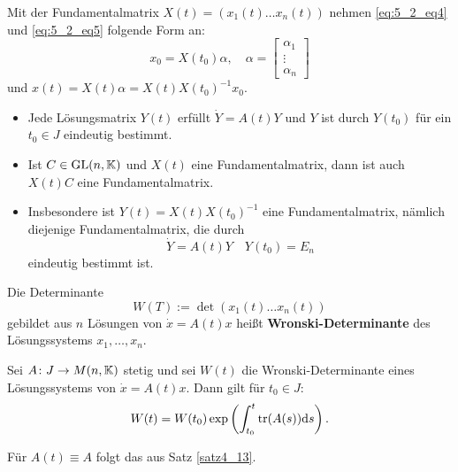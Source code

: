 Mit der Fundamentalmatrix $X(t) = (x_1(t) \dots x_n(t))$ nehmen \eqref{eq:5_2_eq4} und \eqref{eq:5_2_eq5} folgende Form an:
\[x_0 = X(t_0) \alpha, \quad \alpha = \begin{bmatrix}
	\alpha_1\\\vdots\\\alpha_n
\end{bmatrix}\]
und $x(t) = X(t) \alpha = X(t) X(t_0)^{-1} x_0$.
\begin{itemize}
	\item Jede Lösungsmatrix $Y(t)$ erfüllt $\dot{Y} = A(t) Y$ und $Y$ ist durch $Y(t_0)$ für ein $t_0 \in J$ eindeutig bestimmt.
	\item Ist $C \in \mathrm{GL}(n,\mathbb{K})$ und $X(t)$ eine Fundamentalmatrix, dann ist auch $X(t)C$ eine Fundamentalmatrix.
	\item Insbesondere ist $Y(t) = X(t) X(t_0)^{-1}$ eine Fundamentalmatrix, nämlich diejenige Fundamentalmatrix, die durch
	\[\dot{Y} = A(t) Y \quad Y(t_0) = E_n\]
	eindeutig bestimmt ist. 
\end{itemize}
Die Determinante
\[W(T) := \det(x_1(t) \dots x_n(t))\]
gebildet aus $n$ Lösungen von $\dot{x} = A(t) x$ heißt \textbf{Wronski-Determinante} des Lösungssystems $x_1, \dots, x_n$.
\begin{satz}\label{satz5_4}
	Sei $A \colon J \to M(n,\mathbb{K})$ stetig und sei $W(t)$ die Wronski-Determinante eines Lösungssystems von $\dot{x} = A(t) x$. Dann gilt für $t_0 \in J$:
	\[W(t) = W(t_0) \exp\left(\int_{t_0}^{t} \mathrm{tr}(A(s)) \mathrm{d} s\right).\]
\end{satz}
\begin{rem}
	Für $A(t) \equiv A$ folgt das aus Satz \ref{satz4_13}.
\end{rem}